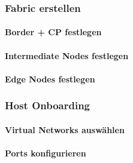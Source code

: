\subsubsection{Fabric erstellen}
\paragraph{Border + CP festlegen}
\paragraph{Intermediate Nodes festlegen}
\paragraph{Edge Nodes festlegen}

\subsubsection{Host Onboarding}

\paragraph{Virtual Networks auswählen}

\paragraph{Ports konfigurieren}


